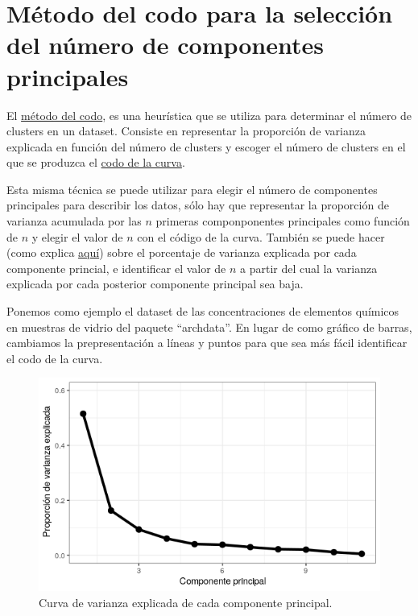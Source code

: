 \documentclass[12pt]{article}
\begin{document}
\section{Método del codo para la selección del número de componentes
  principales}

El
\href{https://en.wikipedia.org/wiki/Elbow_method_(clustering)}{método
  del codo}, es una heurística que se utiliza para determinar el
número de clusters en un dataset. Consiste en representar la
proporción de varianza explicada en función del número de clusters y
escoger el número de clusters en el que se produzca el
\href{https://en.wikipedia.org/wiki/Knee_of_a_curve}{codo de la
  curva}.

Esta misma técnica se puede utilizar para elegir el número de
componentes principales para describir los datos, sólo hay que
representar la proporción de varianza acumulada por las $n$ primeras
componponentes principales como función de $n$ y elegir el valor de
$n$ con el código de la curva. También se puede hacer (como explica
\href{https://feliperego.github.io/blog/2016/05/31/Intro-To-Principal-Component-Analysis}{aquí})
sobre el porcentaje de varianza explicada por cada componente
princial, e identificar el valor de $n$ a partir del cual la varianza
explicada por cada posterior componente principal sea baja.

Ponemos como ejemplo el dataset de las concentraciones de elementos
químicos en muestras de vidrio del paquete ``archdata''. En lugar de
como gráfico de barras, cambiamos la prepresentación a líneas y puntos
para que sea más fácil identificar el codo de la curva.

\begin{figure}[H]
  \centering
  \includegraphics[width=120mm]{imgs/elbow}
  \caption{Curva de varianza explicada de cada componente principal.}
\end{figure}
\end{document}
